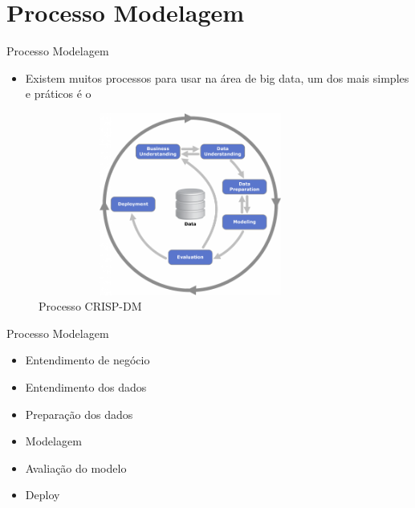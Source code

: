 \section{Processo Modelagem}

\begin{frame}	
	\begin{block}{Processo Modelagem}	
			\begin{itemize}
				\item Existem muitos processos para usar na área de big data, um dos mais simples e práticos é o  \href{http://www.bigdatabusiness.com.br/se-voce-se-interessa-por-big-data-precisa-entender-o-crisp-dm/}{\color{blue}{CRISP-DM}} 
			\end{itemize}
			\begin{figure}[!htb]
				\centering	  				
					\includegraphics[height=6cm, width = 10cm]{./pic/CRISPDM.png}
				\caption{Processo CRISP-DM}
				\label{fig_brincadeira}
		\end{figure}	
	\end{block}
\end{frame}

\begin{frame}	
	\begin{block}{Processo Modelagem}	
			\begin{itemize}
				\item Entendimento de negócio
				\item Entendimento dos dados
				\item Preparação dos dados 
				\item Modelagem
				\item Avaliação do modelo
				\item Deploy
			\end{itemize}
	\end{block}
\end{frame}

